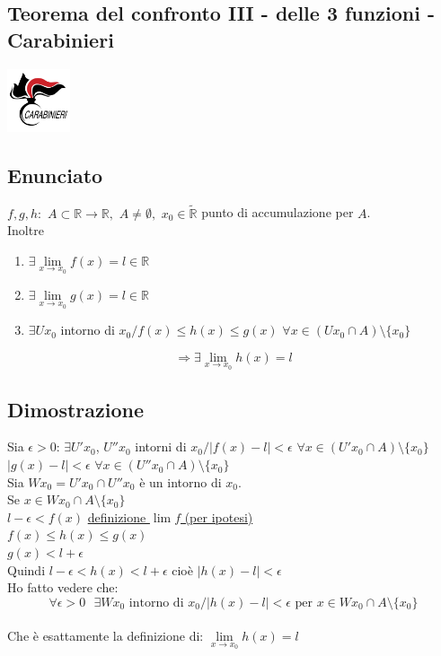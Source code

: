 \documentclass{article}
\newcommand{\R}{\mathbb{R}}
\newcommand{\Rext}{\widetilde{\mathbb{R}}}
\newcommand{\vSpace}{\vspace{1em}}
\begin{document}
\begin{flushleft}
\newpage
\section{Teorema del confronto III - delle 3 funzioni - Carabinieri}
\includegraphics[width = 5em]{./images/carabinieri.png}
\subsection{Enunciato}
$f, g, h:$ $A \subset \R \rightarrow \R,$ $A \neq \emptyset,$ $x_0 \in \Rext$ punto di accumulazione per $A$.
\\Inoltre
\begin{enumerate}
    \item[] $\exists \lim\limits_{x \to x_0} f(x) = l \in \R$ 
    \item[] $\exists \lim\limits_{x \to x_0} g(x) = l \in \R$
    \item[] $\exists U x_0$ intorno di $x_0 / f(x) \leq h(x) \leq g(x)$ $\forall x \in (U x_0 \cap A) \setminus \{x_0\}$
\end{enumerate}
\[ \Rightarrow \exists \lim\limits_{x \to x_0} h(x) = l \]


\subsection{Dimostrazione}
Sia $\epsilon > 0$: $\exists U' x_0$, $U'' x_0$ intorni di $x_0 / \left|f(x) - l\right| < \epsilon$  $\forall x \in (U' x_0 \cap A) \setminus \{x_0\}$
\\\hspace*{16.32em} $\left|g(x) - l\right| < \epsilon$  $\forall x \in (U'' x_0 \cap A) \setminus \{x_0\}$
\\\vSpace Sia $W x_0 = U' x_0 \cap U'' x_0$ è un intorno di $x_0$.
\\Se $x \in W x_0 \cap A \setminus \{x_0\}$
\vSpace
\\\hspace*{18em}$l - \epsilon < f(x)$ \underline{definizione $\lim f$ (per ipotesi)}
\\\hspace*{18em}\hspace*{3.3em}$f(x) \leq h(x) \leq g(x)$
\\\hspace*{18em}\hspace*{9.8em}$g(x) < l + \epsilon$
\vSpace
\\Quindi $l - \epsilon < h(x) < l + \epsilon$ cioè $\left|h(x) - l\right| < \epsilon$
\\Ho fatto vedere che:
\[
    \forall \epsilon > 0 \text{ } \exists W x_0 \text{ intorno di } x_0 / \left|h(x) - l\right| < \epsilon \text{ per } x \in W x_0 \cap A \setminus \{x_0\}
\]
\\Che è esattamente la definizione di: $\lim\limits_{x \to x_0} h(x) = l$


\end{flushleft}
\end{document}
